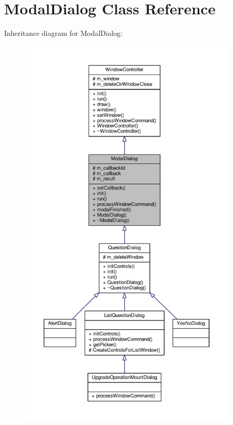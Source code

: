 \hypertarget{classModalDialog}{}\section{Modal\+Dialog Class Reference}
\label{classModalDialog}


Inheritance diagram for Modal\+Dialog\+:
\nopagebreak
\begin{figure}[H]
\begin{center}
\leavevmode
\includegraphics[height=550pt]{dd/d8a/classModalDialog__inherit__graph}
\end{center}
\end{figure}


